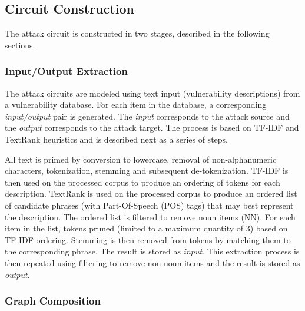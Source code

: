 
\subsection{Circuit Construction}

The attack circuit is constructed in two stages, described in the following sections.

\subsubsection{Input/Output Extraction}
\label{subsubsec:input_output_extraction}

The attack circuits are modeled using text input (vulnerability descriptions) from a vulnerability database. For each item in the database, a corresponding \textit{input/output} pair is generated. The \textit{input} corresponds to the attack source and the \textit{output} corresponds to the attack target. The process is based on TF-IDF \cite{leskovec2014mining} and TextRank \cite{mihalcea2004textrank,PyTextRank} heuristics and is described next as a series of steps.

All text is primed by conversion to lowercase, removal of non-alphanumeric characters, tokenization, stemming \cite{porter1980algorithm,jones1997readings} and subsequent de-tokenization. TF-IDF is then used on the processed corpus to produce an ordering of tokens for each description. TextRank is used on the processed corpus to produce an ordered list of candidate phrases (with Part-Of-Speech (POS) tags) that may best represent the description. The ordered list is filtered to remove noun items (NN). For each item in the list, tokens pruned (limited to a maximum quantity of $3$) based on TF-IDF ordering. Stemming is then removed from tokens by matching them to the corresponding phrase. The result is stored as \textit{input}. This extraction process is then repeated using filtering to remove non-noun items and the result is stored as \textit{output}.

\subsubsection{Graph Composition}

